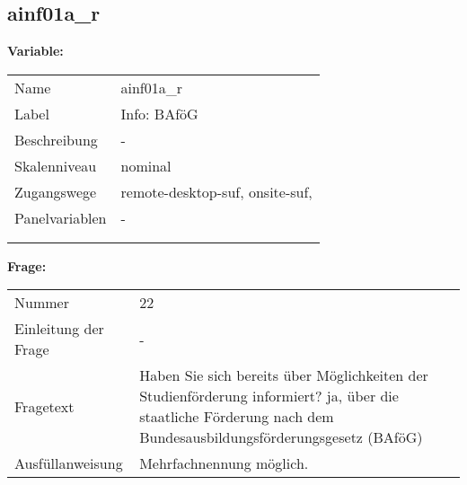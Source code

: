 	
	
	\subsection{ainf01a\_r}
	\label{subSection:ainf01a_r}

	\noindent\textbf{Variable:}\\
		\begin{tabular}{lL{11.3cm}}
			\label{tableVariable:ainf01a_r}
			Name & ainf01a\_r \\
			Label & Info: BAföG \\
			Beschreibung & - \\
			Skalenniveau & nominal \\
			Zugangswege &
				remote-desktop-suf,
				onsite-suf,
 \\
			Panelvariablen & -
			 \\
			 \\
 \\
		\end{tabular}

		\vspace*{1 cm}
		\noindent\textbf{Frage:}\\
		\begin{tabular}{lL{11.3cm}}
			\label{tableQuestion:ainf01a_r}
			Nummer & 22 \\
			Einleitung der Frage & - \\
			Fragetext & Haben Sie sich bereits über Möglichkeiten der Studienförderung informiert?
ja, über die staatliche Förderung nach dem Bundesausbildungsförderungsgesetz (BAföG) \\
			Ausfüllanweisung & Mehrfachnennung möglich. \\
		\end{tabular}





